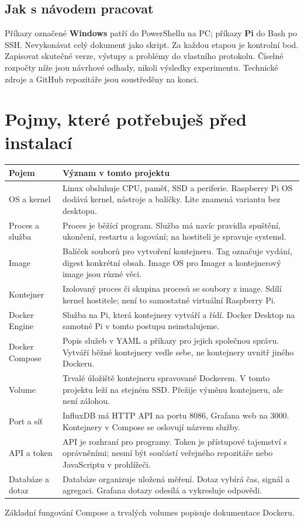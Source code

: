 \documentclass[11pt,a4paper]{article}
\begin{document}
\subsection{Jak s návodem pracovat}
Příkazy označené \textbf{Windows} patří do PowerShellu na PC; příkazy \textbf{Pi} do Bash po SSH. Nevykonávat celý dokument jako skript. Za každou etapou je kontrolní bod. Zapisovat skutečné verze, výstupy a problémy do vlastního protokolu. Číselné rozpočty níže jsou návrhové odhady, nikoli výsledky experimentu. Technické zdroje a GitHub repozitáře jsou soustředěny na konci.

\clearpage
\section{Pojmy, které potřebuješ před instalací}
\par\noindent\begin{tabularx}{\textwidth}{L{30mm}Y}
\toprule Pojem & Význam v tomto projektu\\\midrule
OS a kernel & Linux obsluhuje CPU, paměť, SSD a periferie. Raspberry Pi OS dodává kernel, nástroje a balíčky. Lite znamená variantu bez desktopu.\\\addlinespace
Proces a služba & Proces je běžící program. Služba má navíc pravidla spuštění, ukončení, restartu a logování; na hostiteli je spravuje systemd.\\\addlinespace
Image & Balíček souborů pro vytvoření kontejneru. Tag označuje vydání, digest konkrétní obsah. Image OS pro Imager a kontejnerový image jsou různé věci.\\\addlinespace
Kontejner & Izolovaný proces či skupina procesů se soubory z image. Sdílí kernel hostitele; není to samostatné virtuální Raspberry Pi.\\\addlinespace
Docker Engine & Služba na Pi, která kontejnery vytváří a řídí. Docker Desktop na samotné Pi v tomto postupu neinstalujeme.\\\addlinespace
Docker Compose & Popis služeb v YAML a příkazy pro jejich společnou správu. Vytváří běžné kontejnery vedle sebe, ne kontejnery uvnitř jiného Dockeru.\\\addlinespace
Volume & Trvalé úložiště kontejneru spravované Dockerem. V tomto projektu leží na stejném SSD. Přežije výměnu kontejneru, ale není zálohou.\\\addlinespace
Port a síť & InfluxDB má HTTP API na portu 8086, Grafana web na 3000. Kontejnery v Compose se oslovují názvem služby.\\\addlinespace
API a token & API je rozhraní pro programy. Token je přístupové tajemství s oprávněními; nesmí být součástí veřejného repozitáře nebo JavaScriptu v prohlížeči.\\\addlinespace
Databáze a dotaz & Databáze organizuje uložená měření. Dotaz vybírá čas, signál a agregaci. Grafana dotazy odesílá a vykresluje odpovědi.\\
\bottomrule
\end{tabularx}\par
Základní fungování Compose a trvalých volumes popisuje dokumentace Dockeru.\cite{compose,volumes}
\end{document}
